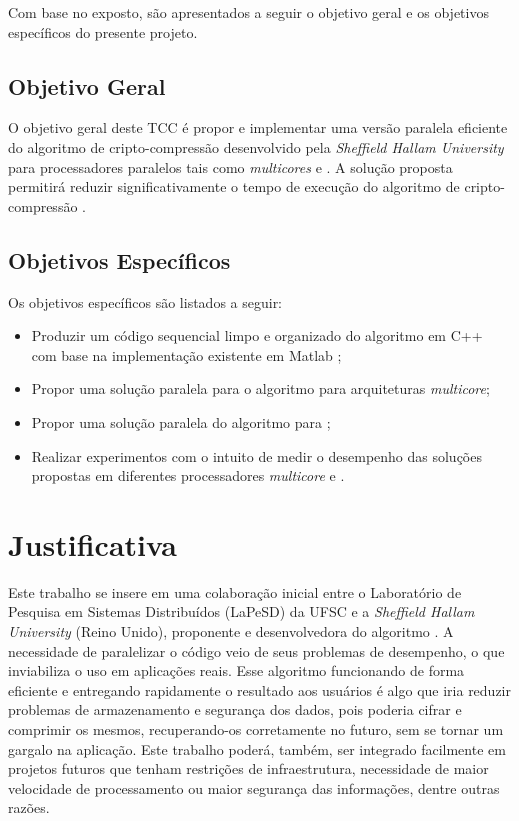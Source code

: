 Com base no exposto, são apresentados a seguir o objetivo geral e os objetivos específicos do presente projeto.

\subsection{Objetivo Geral}

O objetivo geral deste TCC é propor e implementar uma versão paralela eficiente do algoritmo de cripto-compressão \gmpr desenvolvido pela \textit{Sheffield Hallam University} para processadores paralelos tais como \textit{multicores} e \gpus. A solução proposta permitirá reduzir significativamente o tempo de execução do algoritmo de cripto-compressão \gmpr.

\subsection{Objetivos Específicos}

Os objetivos específicos são listados a seguir:

\begin{itemize}
\item Produzir um código sequencial limpo e organizado do algoritmo \gmpr em C++ com base na implementação existente em Matlab \cite{shu13715};
\item Propor uma solução paralela para o algoritmo para arquiteturas \textit{multicore};
\item Propor uma solução paralela do algoritmo para \gpus;
\item Realizar experimentos com o intuito de medir o desempenho das soluções propostas em diferentes processadores \textit{multicore} e \gpus.
\end{itemize}

\section{Justificativa}

Este trabalho se insere em uma colaboração inicial entre o Laboratório de Pesquisa em Sistemas Distribuídos (LaPeSD) da UFSC e a \textit{Sheffield Hallam University} (Reino Unido), proponente e desenvolvedora do algoritmo \gmpr. A necessidade de paralelizar o código veio de seus problemas de desempenho, o que inviabiliza o uso em aplicações reais. Esse algoritmo funcionando de forma eficiente e entregando rapidamente o resultado aos usuários é algo que iria reduzir problemas de armazenamento e segurança dos dados, pois poderia cifrar e comprimir os mesmos, recuperando-os corretamente no futuro, sem se tornar um gargalo na aplicação. Este trabalho poderá, também, ser integrado facilmente em projetos futuros que tenham restrições de infraestrutura, necessidade de maior velocidade de processamento ou maior segurança das informações, dentre outras razões.

